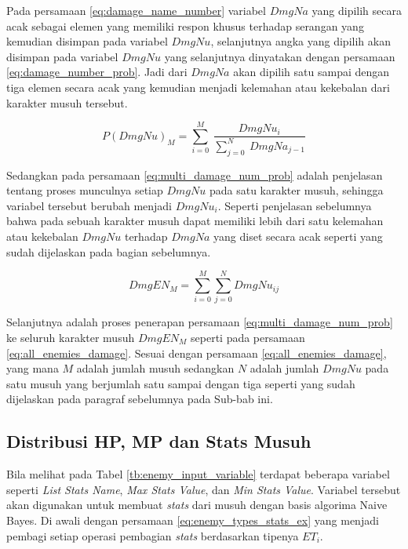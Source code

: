 Pada persamaan \ref{eq:damage_name_number} variabel $DmgNa$ yang dipilih secara acak sebagai elemen yang memiliki respon khusus terhadap serangan yang kemudian disimpan pada variabel $DmgNu$, selanjutnya angka yang dipilih akan disimpan pada variabel $DmgNu$ yang selanjutnya dinyatakan dengan persamaan \ref{eq:damage_number_prob}. Jadi dari $DmgNa$ akan dipilih satu sampai dengan tiga elemen secara acak yang kemudian menjadi kelemahan atau kekebalan dari karakter musuh tersebut.
\vspace{1ex}

\begin{equation}\label{eq:multi_damage_num_prob}
P(DmgNu)_{M} = \sum_{i = 0}^{M}\ \frac{DmgNu_{i}}{\sum_{j = 0}^{N}\ DmgNa_{j - 1}}
\end{equation}

Sedangkan pada persamaan \ref{eq:multi_damage_num_prob} adalah penjelasan tentang proses munculnya setiap $DmgNu$ pada satu karakter musuh, sehingga variabel tersebut berubah menjadi $DmgNu_{i}$. Seperti penjelasan sebelumnya bahwa pada sebuah karakter musuh dapat memiliki lebih dari satu kelemahan atau kekebalan $DmgNu$ terhadap $DmgNa$ yang diset secara acak seperti yang sudah dijelaskan pada bagian sebelumnya.
\vspace{1ex}

\begin{equation}\label{eq:all_enemies_damage}
DmgEN_{M} = \sum_{i = 0}^{M}\sum_{j = 0}^{N} DmgNu_{ij}
\end{equation}

Selanjutnya adalah proses penerapan persamaan \ref{eq:multi_damage_num_prob} ke seluruh karakter musuh $DmgEN_{M}$ seperti pada persamaan \ref{eq:all_enemies_damage}. Sesuai dengan persamaan \ref{eq:all_enemies_damage}, yang mana $M$ adalah jumlah musuh sedangkan $N$ adalah jumlah $DmgNu$ pada satu musuh yang berjumlah satu sampai dengan tiga seperti yang sudah dijelaskan pada paragraf sebelumnya pada Sub-bab ini.
\vspace{1ex}


\subsection{Distribusi HP, MP dan Stats Musuh}
\label{sec:sub_sec3_enemy_hp_mp_stats}
\vspace{1ex}

Bila melihat pada Tabel \ref{tb:enemy_input_variable} terdapat beberapa variabel seperti \textit{List Stats Name}, \textit{Max Stats Value}, dan \textit{Min Stats Value}. Variabel tersebut akan digunakan untuk membuat \textit{stats} dari musuh dengan basis algorima Naive Bayes. Di awali dengan persamaan \ref{eq:enemy_types_stats_ex} yang menjadi pembagi setiap operasi pembagian \textit{stats} berdasarkan tipenya $ET_{i}$.
\vspace{1ex}

